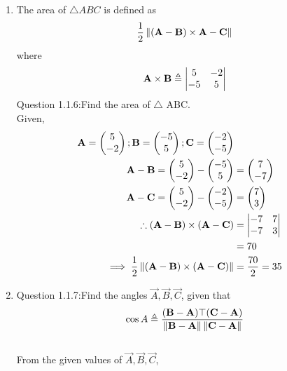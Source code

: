 \documentclass[11pt]{book}
\begin{document}
\begin{enumerate}[label=\thesection.\arabic*.,ref=\thesection.\theenumi]
\item The area of $\triangle ABC$ is defined as
		\begin{align}
			\frac{1}{2}\left\lVert{\ensuremath{\left(\mathbf{A}-\mathbf{B}\right)}\times {\mathbf{A}-\mathbf{C}}}\right\rVert
		\end{align}
		where
		\begin{align}
			\mathbf{A}\times\mathbf{B} \triangleq \begin{vmatrix}5 & -2 \\-5 & 5\end{vmatrix}
		\end{align}
Question 1.1.6:Find the area of $\triangle$ ABC.\\
\solution
Given,
\begin{align}
\mathbf{A} = \begin{pmatrix}5\\-2\end{pmatrix};
\mathbf{B} = \begin{pmatrix}-5\\5\end{pmatrix};
\mathbf{C} = \begin{pmatrix}-2\\-5\end{pmatrix}\\
\mathbf{A}-\mathbf{B}=\begin{pmatrix}5\\-2\end{pmatrix}-\begin{pmatrix}-5\\5\end{pmatrix}&=\begin{pmatrix}7\\-7\end{pmatrix}\\
\mathbf{A}-\mathbf{C}=\begin{pmatrix}5\\-2\end{pmatrix}-\begin{pmatrix}-2\\-5\end{pmatrix}&=\begin{pmatrix}7\\3\end{pmatrix}\\
\therefore(\mathbf{A}-\mathbf{B})\times(\mathbf{A}-\mathbf{C}) &=\begin{vmatrix}-7 & 7\\-7 & 3\end{vmatrix}\\&=70\\
\implies\frac{1}{2}\left\lVert(\mathbf{A}-\mathbf{B})\times(\mathbf{A}-\mathbf{C})\right\rVert&=\frac{70}{2}=35
\end{align}


\item
Question 1.1.7:Find the angles $\vec{A},\vec{B},\vec{C}$, given that 
\begin{align}
	\cos{A} \triangleq \frac{(\mathbf{B}-\mathbf{A})\top(\mathbf{C}-\mathbf{A})}{\left\lVert\mathbf{B}-\mathbf{A}\right\rVert\left\lVert\mathbf{C}-\mathbf{A}\right\rVert}
\end{align}
\solution 
\\
From the given values of $\vec{A},\vec{B},\vec{C}$,\\
\begin{enumerate}


\end{enumerate}
\end{enumerate}
\end{document}
